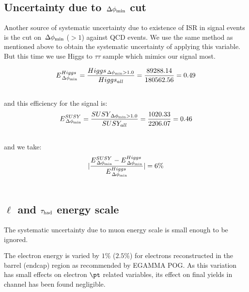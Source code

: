 \subsection{\texorpdfstring{Uncertainty due to $\,{\Delta\phi_{\rm min}}$ cut}{Uncertainty due to minDeltaPhiJMET cut}}
Another source of systematic uncertainty due to existence of ISR in signal events is the cut on $\,{\Delta\phi_{\rm min}}$ ($ > 1$) against QCD events. We use the same method as mentioned above to obtain the systematic uncertainty of applying this variable. But this time we use Higgs to $\tau \tau$ sample which mimics our signal most.

\begin{align}
E^{Higgs}_{\,{\Delta\phi_{\rm min}}} &= \frac{Higgs_{\,{\Delta\phi_{\rm min}}>1.0}}{Higgs_{all}} = \frac{89288.14}{180562.56} = 0.49 \\ \nonumber
\end{align}
and this efficiency for the signal is: 
\begin{align}
E^{SUSY}_{\,{\Delta\phi_{\rm min}}} &= \frac{SUSY_{\,{\Delta\phi_{\rm min}}>1.0}}{SUSY_{all}} = \frac{1020.33}{2206.07} = 0.46 \\ \nonumber
\end{align}
and we take:
\begin{align}
|\frac{E^{SUSY}_{\,{\Delta\phi_{\rm min}}}-E^{Higgs}_{\,{\Delta\phi_{\rm min}}}}{E^{Higgs}_{\,{\Delta\phi_{\rm min}}}}| &= 6 \% \\ \nonumber
\end{align}

\subsection{\texorpdfstring{$\ell$ and $\tau_{\rm had}$ energy scale}{Energy scale}}
The systematic uncertainty due to muon energy scale is small enough to be ignored.

The electron energy is varied by $1\%$ ($2.5\%$) for electrons reconstructed in the barrel (endcap) region as recommended by EGAMMA POG\cite{eEnergyScale}. As this variation has small effects on electron $\pt$ related variables, its effect on final yields in \eTau channel has been found negligible.

